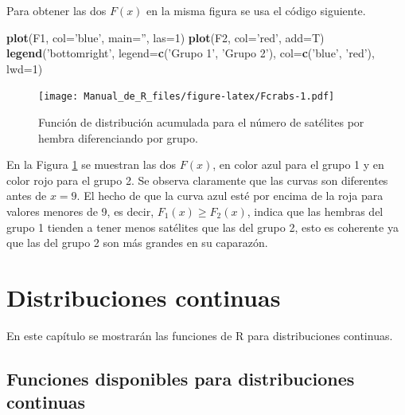 \documentclass[10pt,]{krantz}
\makeatletter
\newenvironment{Shaded}{\begin{snugshade}}{\end{snugshade}}
\newcommand{\KeywordTok}[1]{\textcolor[rgb]{0.13,0.29,0.53}{\textbf{#1}}}
\newcommand{\DataTypeTok}[1]{\textcolor[rgb]{0.13,0.29,0.53}{#1}}
\newcommand{\DecValTok}[1]{\textcolor[rgb]{0.00,0.00,0.81}{#1}}
\newcommand{\StringTok}[1]{\textcolor[rgb]{0.31,0.60,0.02}{#1}}
\newcommand{\NormalTok}[1]{#1}
\let\proglang=\textsf
\newenvironment{kframe}{%
\medskip{}
\setlength{\fboxsep}{.8em}
 \def\at@end@of@kframe{}%
 \ifinner\ifhmode%
  \def\at@end@of@kframe{\end{minipage}}%
  \begin{minipage}{\columnwidth}%
 \fi\fi%
 \def\FrameCommand##1{\hskip\@totalleftmargin \hskip-\fboxsep
 \colorbox{shadecolor}{##1}\hskip-\fboxsep
     \hskip-\linewidth \hskip-\@totalleftmargin \hskip\columnwidth}%
 \MakeFramed {\advance\hsize-\width
   \@totalleftmargin\z@ \linewidth\hsize
   \@setminipage}}%
 {\par\unskip\endMakeFramed%
 \at@end@of@kframe}
\renewenvironment{Shaded}{\begin{kframe}}{\end{kframe}}
\makeatother
\begin{document}
Para obtener las dos \(F(x)\) en la misma figura se usa el código
siguiente.

\begin{Shaded}
\begin{Highlighting}[]
\KeywordTok{plot}\NormalTok{(F1, }\DataTypeTok{col=}\StringTok{'blue'}\NormalTok{, }\DataTypeTok{main=}\StringTok{''}\NormalTok{, }\DataTypeTok{las=}\DecValTok{1}\NormalTok{)}
\KeywordTok{plot}\NormalTok{(F2, }\DataTypeTok{col=}\StringTok{'red'}\NormalTok{, }\DataTypeTok{add=}\NormalTok{T)}
\KeywordTok{legend}\NormalTok{(}\StringTok{'bottomright'}\NormalTok{, }\DataTypeTok{legend=}\KeywordTok{c}\NormalTok{(}\StringTok{'Grupo 1'}\NormalTok{, }\StringTok{'Grupo 2'}\NormalTok{),}
       \DataTypeTok{col=}\KeywordTok{c}\NormalTok{(}\StringTok{'blue'}\NormalTok{, }\StringTok{'red'}\NormalTok{), }\DataTypeTok{lwd=}\DecValTok{1}\NormalTok{)}
\end{Highlighting}
\end{Shaded}

\begin{figure}
\centering
\texttt{[image: Manual\_de\_R\_files/figure-latex/Fcrabs-1.pdf]}
\caption{\label{fig:Fcrabs}Función de distribución acumulada para el número
de satélites por hembra diferenciando por grupo.}
\end{figure}

En la Figura \ref{fig:Fcrabs} se muestran las dos \(F(x)\), en color
azul para el grupo 1 y en color rojo para el grupo 2. Se observa
claramente que las curvas son diferentes antes de \(x=9\). El hecho de
que la curva azul esté por encima de la roja para valores menores de 9,
es decir, \(F_1(x) \geq F_2(x)\), indica que las hembras del grupo 1
tienden a tener menos satélites que las del grupo 2, esto es coherente
ya que las del grupo 2 son más grandes en su caparazón.

\chapter{\texorpdfstring{Distribuciones continuas
\label{continuas}}{Distribuciones continuas }}\label{distribuciones-continuas}

En este capítulo se mostrarán las funciones de \proglang{R} para
distribuciones continuas.

\section{Funciones disponibles para distribuciones
continuas}\label{funciones-disponibles-para-distribuciones-continuas}
\end{document}
